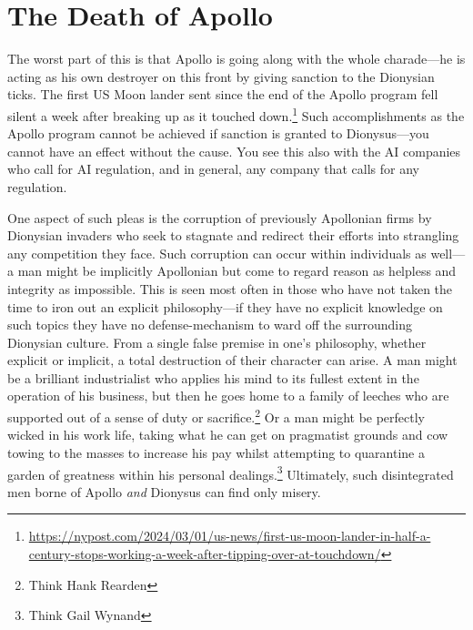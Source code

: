 \documentclass[11pt]{article}
\begin{document}
\section{The Death of Apollo}
\label{sec:org9bbef38}
The worst part of this is that Apollo is going along with the whole charade---he is acting as his own destroyer on this front by giving sanction to the Dionysian ticks. The first US Moon lander sent since the end of the Apollo program fell silent a week after breaking up as it touched down.\footnote{\url{https://nypost.com/2024/03/01/us-news/first-us-moon-lander-in-half-a-century-stops-working-a-week-after-tipping-over-at-touchdown/}} Such accomplishments as the Apollo program cannot be achieved if sanction is granted to Dionysus---you cannot have an effect without the cause. You see this also with the AI companies who call for AI regulation, and in general, any company that calls for any regulation.

One aspect of such pleas is the corruption of previously Apollonian firms by Dionysian invaders who seek to stagnate and redirect their efforts into strangling any competition they face. Such corruption can occur within individuals as well---a man might be implicitly Apollonian but come to regard reason as helpless and integrity as impossible. This is seen most often in those who have not taken the time to iron out an explicit philosophy---if they have no explicit knowledge on such topics they have no defense-mechanism to ward off the surrounding Dionysian culture. From a single false premise in one's philosophy, whether explicit or implicit, a total destruction of their character can arise. A man might be a brilliant industrialist who applies his mind to its fullest extent in the operation of his business, but then he goes home to a family of leeches who are supported out of a sense of duty or sacrifice.\footnote{Think Hank Rearden} Or a man might be perfectly wicked in his work life, taking what he can get on pragmatist grounds and cow towing to the masses to increase his pay whilst attempting to quarantine a garden of greatness within his personal dealings.\footnote{Think Gail Wynand} Ultimately, such disintegrated men borne of Apollo \emph{and} Dionysus can find only misery.
\end{document}
